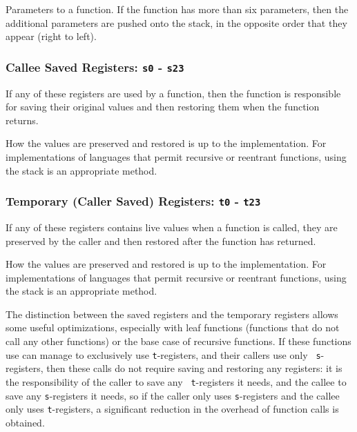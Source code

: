 Parameters to a function.  If the function has more than six
parameters, then the additional parameters are pushed onto the stack,
in the opposite order that they appear (right to left).

\subsubsection{Callee Saved Registers:  {\tt s0} - {\tt s23}}

If any of these registers are used by a function, then the function is
responsible for saving their original values and then restoring them
when the function returns.

How the values are preserved and restored is up to the implementation. 
For implementations of languages that permit recursive or reentrant
functions, using the stack is an appropriate method.

\subsubsection{Temporary (Caller Saved) Registers:  {\tt t0} - {\tt t23}}

If any of these registers contains live values when a function is
called, they are preserved by the caller and then restored after the
function has returned.

How the values are preserved and restored is up to the implementation. 
For implementations of languages that permit recursive or reentrant
functions, using the stack is an appropriate method.

The distinction between the saved registers and the temporary
registers allows some useful optimizations, especially with leaf
functions (functions that do not call any other functions) or the base
case of recursive functions.  If these functions use can manage to
exclusively use {\tt t}-registers, and their callers use only {\tt
s}-registers, then these calls do not require saving and restoring any
registers:  it is the responsibility of the caller to save any {\tt
t}-registers it needs, and the callee to save any {\tt s}-registers it
needs, so if the caller only uses {\tt s}-registers and the callee
only uses {\tt t}-registers, a significant reduction in the overhead
of function calls is obtained.

